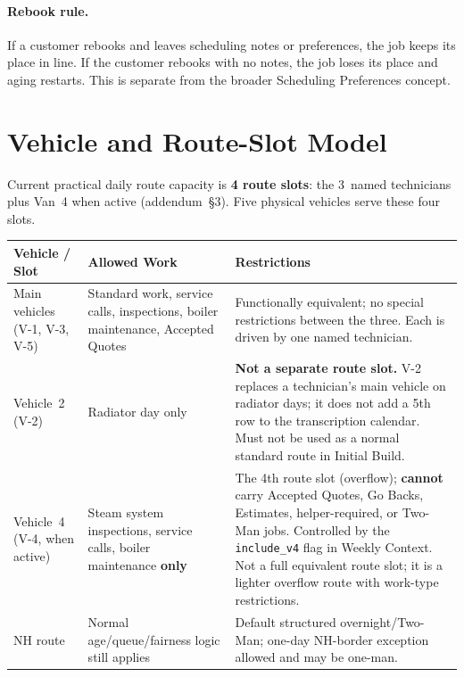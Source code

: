 \documentclass[12pt]{article}
\begin{document}
\paragraph{Rebook rule.}
If a customer rebooks and leaves scheduling notes or preferences, the job keeps its place in line.
If the customer rebooks with no notes, the job loses its place and aging restarts.
This is separate from the broader Scheduling Preferences concept.

\section*{Vehicle and Route-Slot Model}

Current practical daily route capacity is \textbf{4 route slots}: the 3~named technicians plus Van~4 when active (addendum~\S3).
Five physical vehicles serve these four slots.

\medskip
{\small
\begin{longtable}{lp{4cm}p{5.5cm}}
\toprule
\textbf{Vehicle / Slot} & \textbf{Allowed Work} & \textbf{Restrictions} \\
\midrule
Main vehicles (V-1, V-3, V-5)  & Standard work, service calls, inspections, boiler maintenance, Accepted Quotes & Functionally equivalent; no special restrictions between the three.  Each is driven by one named technician. \\
Vehicle~2 (V-2)    & Radiator day only & \textbf{Not a separate route slot.} V-2 replaces a technician's main vehicle on radiator days; it does not add a 5th row to the transcription calendar. Must not be used as a normal standard route in Initial Build. \\
Vehicle~4 (V-4, when active) & Steam system inspections, service calls, boiler maintenance \textbf{only} & The 4th route slot (overflow); \textbf{cannot} carry Accepted Quotes, Go Backs, Estimates, helper-required, or Two-Man jobs. Controlled by the \texttt{include\_v4} flag in Weekly Context.  Not a full equivalent route slot; it is a lighter overflow route with work-type restrictions. \\
NH route           & Normal age/queue/fairness logic still applies & Default structured overnight/Two-Man; one-day NH-border exception allowed and may be one-man. \\
\bottomrule
\end{longtable}
}
\end{document}

